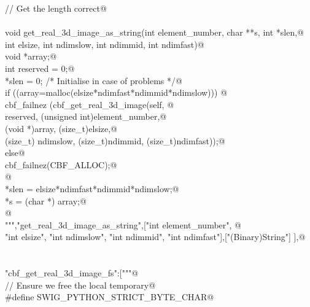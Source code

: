 \documentclass[10pt,a4paper,twoside,notitlepage]{article}
\begin{document}
\begin{flushleft}
\begin{list}{}{}
\mbox{}\verb@// Get the length correct@\\
\mbox{}\verb@@\\
\mbox{}\verb@    void get_real_3d_image_as_string(int element_number, char **s, int *slen,@\\
\mbox{}\verb@    int elsize, int ndimslow, int ndimmid, int ndimfast){@\\
\mbox{}\verb@        void *array;@\\
\mbox{}\verb@        int reserved = 0;@\\
\mbox{}\verb@        *slen = 0; /* Initialise in case of problems */@\\
\mbox{}\verb@        if ((array=malloc(elsize*ndimfast*ndimmid*ndimslow))) {@\\
\mbox{}\verb@               cbf_failnez (cbf_get_real_3d_image(self, @\\
\mbox{}\verb@               reserved, (unsigned int)element_number,@\\
\mbox{}\verb@               (void *)array, (size_t)elsize,@\\
\mbox{}\verb@               (size_t) ndimslow, (size_t)ndimmid, (size_t)ndimfast));@\\
\mbox{}\verb@         }else{@\\
\mbox{}\verb@               cbf_failnez(CBF_ALLOC);@\\
\mbox{}\verb@         }@\\
\mbox{}\verb@        *slen = elsize*ndimfast*ndimmid*ndimslow;@\\
\mbox{}\verb@        *s = (char *) array;@\\
\mbox{}\verb@      }@\\
\mbox{}\verb@""","get_real_3d_image_as_string",["int element_number", @\\
\mbox{}\verb@    "int elsize", "int ndimslow", "int ndimmid", "int ndimfast"],["(Binary)String"] ],@\\
\mbox{}\verb@@\\
\mbox{}\verb@@\\
\mbox{}\verb@"cbf_get_real_3d_image_fs":["""@\\
\mbox{}\verb@// Ensure we free the local temporary@\\
\mbox{}\verb@%{@\\
\mbox{}\verb@#define SWIG_PYTHON_STRICT_BYTE_CHAR@\\
\mbox{}\verb@%}@\\
\mbox{}\verb@%cstring_output_allocate_size(char ** s, int *slen, free(*$1))@\\

\end{list}
\end{flushleft}
\end{document}
